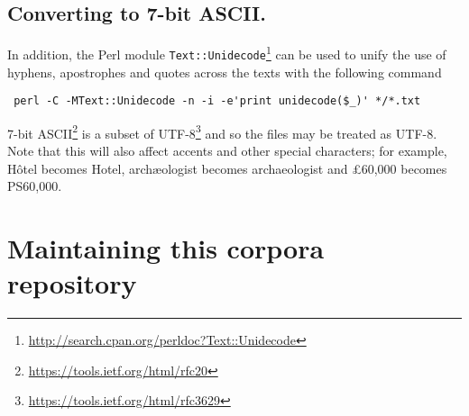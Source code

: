 \documentclass[a4paper,10pt]{paper}
\begin{document}
\subsection{Converting to 7-bit ASCII.}

In addition, the Perl module \texttt{Text::Unidecode}\footnote{\url{http://search.cpan.org/perldoc?Text::Unidecode}} can be used to unify the use of hyphens, apostrophes and quotes across the texts with the following command

\begin{verbatim} perl -C -MText::Unidecode -n -i -e'print unidecode($_)' */*.txt \end{verbatim}

7-bit ASCII\footnote{\url{https://tools.ietf.org/html/rfc20}} is a subset of UTF-8\footnote{\url{https://tools.ietf.org/html/rfc3629}} and so the files may be treated as UTF-8.
Note that this will also affect accents and other special characters; for example, Hôtel becomes Hotel, archæologist becomes archaeologist and £60,000 becomes PS60,000.

\section{Maintaining this corpora repository}
\end{document}
